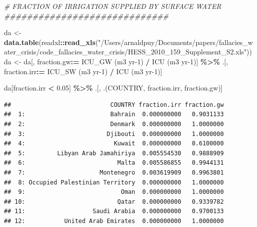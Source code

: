 \documentclass[
  11pt,
]{article}
\newenvironment{Shaded}{\begin{snugshade}}{\end{snugshade}}
\newcommand{\AttributeTok}[1]{\textcolor[rgb]{0.13,0.29,0.53}{#1}}
\newcommand{\CommentTok}[1]{\textcolor[rgb]{0.56,0.35,0.01}{\textit{#1}}}
\newcommand{\FloatTok}[1]{\textcolor[rgb]{0.00,0.00,0.81}{#1}}
\newcommand{\FunctionTok}[1]{\textcolor[rgb]{0.13,0.29,0.53}{\textbf{#1}}}
\newcommand{\NormalTok}[1]{#1}
\newcommand{\OtherTok}[1]{\textcolor[rgb]{0.56,0.35,0.01}{#1}}
\newcommand{\SpecialCharTok}[1]{\textcolor[rgb]{0.81,0.36,0.00}{\textbf{#1}}}
\newcommand{\StringTok}[1]{\textcolor[rgb]{0.31,0.60,0.02}{#1}}
\begin{document}
\begin{Shaded}
\begin{Highlighting}[]
\CommentTok{\# FRACTION OF IRRIGATION SUPPLIED BY SURFACE WATER \#\#\#\#\#\#\#\#\#\#\#\#\#\#\#\#\#\#\#\#\#\#\#\#\#\#\#\#\#}

\NormalTok{da }\OtherTok{\textless{}{-}} \FunctionTok{data.table}\NormalTok{(readxl}\SpecialCharTok{::}\FunctionTok{read\_xls}\NormalTok{(}\StringTok{"/Users/arnaldpuy/Documents/papers/fallacies\_water\_crisis/code\_fallacies\_water\_crisis/HESS\_2010\_159\_Supplement\_S2.xls"}\NormalTok{))}
\NormalTok{da }\OtherTok{\textless{}{-}}\NormalTok{ da[, fraction.gw}\SpecialCharTok{:=} \StringTok{\textasciigrave{}}\AttributeTok{ICU\_GW (m3 yr{-}1)}\StringTok{\textasciigrave{}} \SpecialCharTok{/} \StringTok{\textasciigrave{}}\AttributeTok{ICU (m3 yr{-}1)}\StringTok{\textasciigrave{}}\NormalTok{] }\SpecialCharTok{\%\textgreater{}\%}
\NormalTok{  .[, fraction.irr}\SpecialCharTok{:=} \StringTok{\textasciigrave{}}\AttributeTok{ICU\_SW (m3 yr{-}1)}\StringTok{\textasciigrave{}} \SpecialCharTok{/} \StringTok{\textasciigrave{}}\AttributeTok{ICU (m3 yr{-}1)}\StringTok{\textasciigrave{}}\NormalTok{]}


\NormalTok{da[fraction.irr }\SpecialCharTok{\textless{}} \FloatTok{0.05}\NormalTok{] }\SpecialCharTok{\%\textgreater{}\%}
\NormalTok{  .[, .(COUNTRY, fraction.irr, fraction.gw)]}
\end{Highlighting}
\end{Shaded}

\begin{verbatim}
##                            COUNTRY fraction.irr fraction.gw
##  1:                        Bahrain  0.000000000   0.9031133
##  2:                        Denmark  0.000000000   1.0000000
##  3:                       Djibouti  0.000000000   1.0000000
##  4:                         Kuwait  0.000000000   0.6100000
##  5:         Libyan Arab Jamahiriya  0.005554530   0.9888909
##  6:                          Malta  0.005586855   0.9944131
##  7:                     Montenegro  0.003619909   0.9963801
##  8: Occupied Palestinian Territory  0.000000000   1.0000000
##  9:                           Oman  0.000000000   1.0000000
## 10:                          Qatar  0.000000000   0.9339782
## 11:                   Saudi Arabia  0.000000000   0.9700133
## 12:           United Arab Emirates  0.000000000   1.0000000
\end{verbatim}
\end{document}
